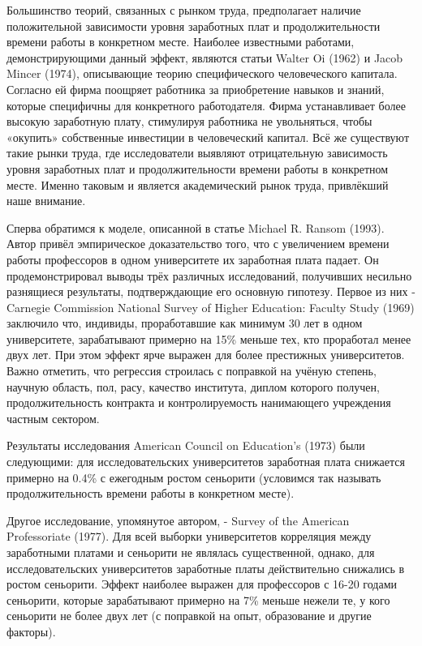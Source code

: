 \documentclass[a4paper, 12pt]{article}
\theoremstyle{definition}
\theoremstyle{plain}
\begin{document}
Большинство теорий, связанных с рынком труда, предполагает наличие положительной зависимости уровня заработных плат и продолжительности времени работы в конкретном месте. Наиболее известными работами, демонстрирующими данный эффект, являются статьи Walter Oi (1962) и Jacob Mincer (1974), описывающие теорию специфического человеческого капитала. Согласно ей фирма поощряет работника за приобретение навыков и знаний, которые специфичны для конкретного работодателя. Фирма устанавливает более высокую заработную плату, стимулируя работника не увольняться, чтобы «окупить» собственные инвестиции в человеческий капитал. Всё же существуют такие рынки труда, где исследователи выявляют отрицательную зависимость уровня заработных плат и продолжительности времени работы в конкретном месте. Именно таковым и является академический рынок труда, привлёкший наше внимание.

Сперва обратимся к моделе, описанной в статье Michael R. Ransom (1993). Автор привёл эмпирическое доказательство того, что с увеличением времени работы профессоров в одном университете их заработная плата падает. Он продемонстрировал выводы трёх различных исследований, получивших несильно разнящиеся результаты, подтверждающие его основную гипотезу. Первое из них - Carnegie Commission National Survey of Higher Education: Faculty Study (1969) заключило что, индивиды, проработавшие как минимум 30 лет в одном университете, зарабатывают примерно на 15\%  меньше тех, кто проработал менее двух лет. При этом эффект ярче выражен для более престижных университетов. Важно отметить, что регрессия строилась с поправкой на учёную степень, научную область, пол, расу, качество института, диплом которого получен, продолжительность контракта и контролируемость нанимающего учреждения частным сектором. 

	Результаты исследования American Council on Education's (1973) были следующими:  для исследовательских университетов заработная плата снижается примерно на 0.4\% с ежегодным ростом сеньорити (условимся так называть продолжительность времени работы в конкретном месте). 
	
	Другое исследование, упомянутое автором, - Survey of the American Professoriate (1977). Для всей выборки университетов корреляция между заработными платами и сеньорити не являлась существенной, однако, для исследовательских университетов заработные платы действительно снижались в ростом сеньорити. Эффект наиболее выражен для профессоров с 16-20 годами сеньорити, которые зарабатывают примерно на 7\% меньше нежели те, у кого сеньорити не более двух лет (с поправкой на опыт, образование и другие факторы). 
	
\end{document}
